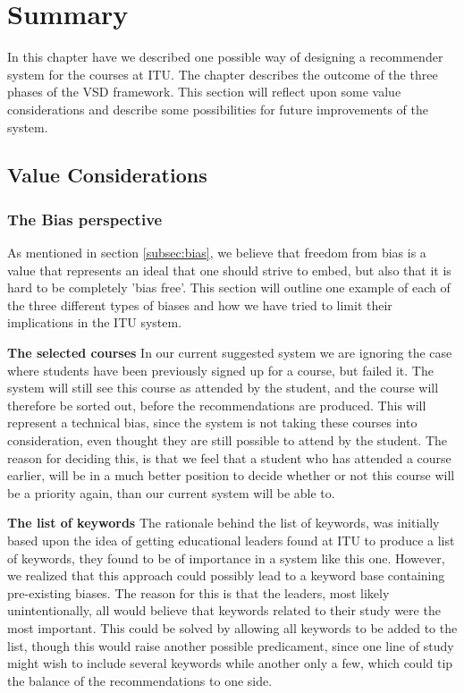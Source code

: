 
\section{Summary}
In this chapter have we described one possible way of designing a recommender system for the courses at ITU. The chapter describes the outcome of the three phases of the VSD framework.\newline
This section will reflect upon some value considerations and describe some possibilities for future improvements of the system. 

\subsection{Value Considerations} %
\label{sub:value_considerations}
\subsubsection{The Bias perspective}
As mentioned in section \ref{subsec:bias}, we believe that freedom from bias is a value that represents an ideal that one should strive to embed, but also that it is hard to be completely 'bias free'. This section will outline one example of each of the three different types of biases and how we have tried to limit their implications in the ITU system.\newline

\textbf{The selected courses}\newline
In our current suggested system we are ignoring the case where students have been previously signed up for a course, but failed it. The system will still see this course as attended by the student, and the course will therefore be sorted out, before the recommendations are produced.\newline
This will represent a technical bias, since the system is not taking these courses into consideration, even thought they are still possible to attend by the student. The reason for deciding this, is that we feel that a student who has attended a course earlier, will be in a much better position to decide whether or not this course will be a priority again, than our current system will be able to.\newline

\textbf{The list of keywords}\newline
The rationale behind the list of keywords, was initially based upon the idea of getting educational leaders found at ITU to produce a list of keywords, they found to be of importance in a system like this one. However, we realized that this approach could possibly lead to a keyword base containing pre-existing biases. The reason for this is that the leaders, most likely unintentionally, all would believe that keywords related to their study were the most important.\newline
This could be solved by allowing all keywords to be added to the list, though this would raise another possible predicament, since one line of study might wish to include several keywords while another only a few, which could tip the balance of the recommendations to one side.

